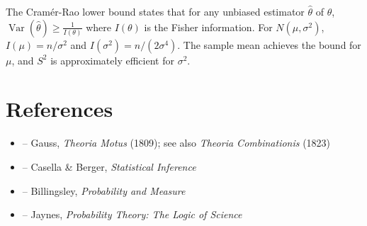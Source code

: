 \begin{solution}
The Cramér-Rao lower bound states that for any unbiased estimator $\hat{\theta}$ of $\theta$, $\operatorname{Var}(\hat{\theta}) \geq \frac{1}{I(\theta)}$ where $I(\theta)$ is the Fisher information. For $N(\mu, \sigma^2)$, $I(\mu) = n/\sigma^2$ and $I(\sigma^2) = n/(2\sigma^4)$. The sample mean achieves the bound for $\mu$, and $S^2$ is approximately efficient for $\sigma^2$.
\end{solution}


\section{References}

\begin{itemize}
    \item \cite{gauss-theoria} -- Gauss, \textit{Theoria Motus} (1809); see also \textit{Theoria Combinationis} (1823)
    \item \cite{casella-berger} -- Casella \& Berger, \textit{Statistical Inference}
    \item \cite{billingsley} -- Billingsley, \textit{Probability and Measure}
    \item \cite{jaynes} -- Jaynes, \textit{Probability Theory: The Logic of Science}
\end{itemize}